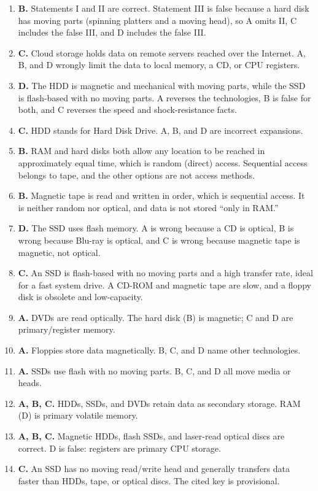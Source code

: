 \begin{enumerate}[label=\textbf{Q\arabic*.}, leftmargin=*]
  as robotic tape libraries. Cache, CPU registers, and RAM are primary
  storage levels, not archival.
\item \textbf{B.} Statements I and II are correct. Statement III is false
  because a hard disk has moving parts (spinning platters and a moving head),
  so A omits II, C includes the false III, and D includes the false III.
\item \textbf{C.} Cloud storage holds data on remote servers reached over the
  Internet. A, B, and D wrongly limit the data to local memory, a CD, or CPU
  registers.
\item \textbf{D.} The HDD is magnetic and mechanical with moving parts, while
  the SSD is flash-based with no moving parts. A reverses the technologies,
  B is false for both, and C reverses the speed and shock-resistance facts.
\item \textbf{C.} HDD stands for Hard Disk Drive. A, B, and D are incorrect
  expansions.
\item \textbf{B.} RAM and hard disks both allow any location to be reached in
  approximately equal time, which is random (direct) access. Sequential
  access belongs to tape, and the other options are not access methods.
\item \textbf{B.} Magnetic tape is read and written in order, which is
  sequential access. It is neither random nor optical, and data is not stored
  ``only in RAM.''
\item \textbf{D.} The SSD uses flash memory. A is wrong because a CD is
  optical, B is wrong because Blu-ray is optical, and C is wrong because
  magnetic tape is magnetic, not optical.
\item \textbf{C.} An SSD is flash-based with no moving parts and a high
  transfer rate, ideal for a fast system drive. A CD-ROM and magnetic tape
  are slow, and a floppy disk is obsolete and low-capacity.

\item \textbf{A.} DVDs are read optically. The hard disk (B) is magnetic; C and D are primary/register memory.
\item \textbf{A.} Floppies store data magnetically. B, C, and D name other technologies.
\item \textbf{A.} SSDs use flash with no moving parts. B, C, and D all move media or heads.
\item \textbf{A, B, C.} HDDs, SSDs, and DVDs retain data as secondary storage. RAM (D) is primary volatile memory.
\item \textbf{A, B, C.} Magnetic HDDs, flash SSDs, and laser-read optical discs are correct. D is false: registers are primary CPU storage.
\item \textbf{C.} An SSD has no moving read/write head and generally transfers data faster than HDDs, tape, or optical discs. The cited key is provisional.


\end{enumerate}

